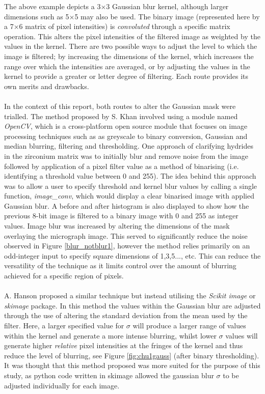 \documentclass{article}
\begin{document}
	The above example depicts a 3$\times$3 Gaussian blur kernel, although larger dimensions such as 5$\times$5 may also be used. The binary image (represented here by a 7$\times$6 matrix of pixel intensities) is \textit{convoluted} through a specific matrix operation. This alters the pixel intensities of the filtered image as weighted by the values in the kernel. There are two possible ways to adjust the level to which the image is filtered; by increasing the dimensions of the kernel, which increases the range over which the intensities are averaged, or by adjusting the values in the kernel to provide a greater or letter degree of filtering. Each route provides its own merits and drawbacks.
	\\
	\\
	In the context of this report, both routes to alter the Gaussian mask were trialled. The method proposed by S. Khan involved using a module named \textit{OpenCV}, which is a cross-platform open source module that focuses on image processing techniques such as as greyscale to binary conversion, Gaussian and median blurring, filtering and thresholding. One approach of clarifying hydrides in the zirconium matrix was to initially blur and remove noise from the image followed by application of a pixel filter value as a method of binarising (i.e. identifying a threshold value between 0 and 255). The idea behind this approach was to allow a user to specify threshold and kernel blur values by calling a single function, \textit{image\_conv}, which would display a clear binarised image with applied Gaussian blur. A before and after histogram is also displayed to show how the previous 8-bit image is filtered to a binary image with 0 and 255 as integer values. Image blur was increased by altering the dimensions of the mask overlaying the micrograph image. This served to significantly reduce the noise observed in Figure \ref{blur_notblur1}, however the method relies primarily on an odd-integer input to specify square dimensions of 1,3,5..., etc. This can reduce the versatility of the technique as it limits control over the amount of blurring achieved for a specific region of pixels. 
	\\
	\\
	A. Hanson proposed a similar technique but instead utilising the \textit{Scikit image} or \textit{skimage} package. In this method the values within the Gaussian blur are adjusted through the use of altering the standard deviation from the mean used by the filter. Here, a larger specified value for $\sigma$ will produce a larger range of values within the kernel and generate a more intense blurring, whilst lower $\sigma$ values will generate higher \textit{relative} pixel intensities at the fringes of the kernel and thus reduce the level of blurring, see Figure \ref{fig:chu1gauss} (after binary thresholding). It was thought that this method proposed was more suited for the purpose of this study, as python code written in skimage allowed the gaussian blur $\sigma$ to be adjusted individually for each image.
	
\end{document}
